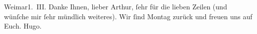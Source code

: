            \vspace{1em}
\pstart
           \raggedleft{}{\pb}Weimar1. III.\pend
           \vspace{0.5em}
\pstart
           Danke Ihnen, lieber Arthur, ſehr für die lieben Zeilen (und wünſche
               mir ſehr mündlich weiteres). Wir ſind Montag zurück und freuen uns auf
               Euch.\pend
           \pstart \spacefill\mbox{Hugo.}\pend{}\endnumbering{}  
      